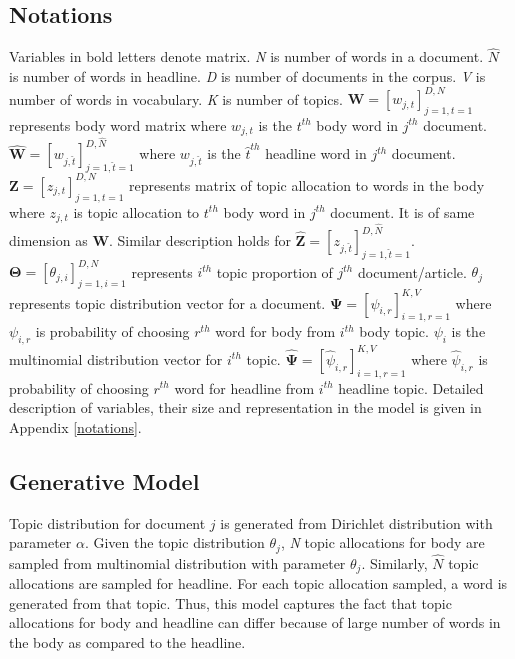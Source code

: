 \documentclass[a4paper]{article}
\begin{document}
\subsection{Notations}
Variables in bold letters denote matrix.
\emph{N} is number of words in a document. $\hat{N}$ is number of words in headline. \emph{D} is number of documents in the corpus. \emph{V} is number of words in vocabulary. \emph{K} is number of topics. $\mathbf{W} = [w_{j,t}]_{j=1, t=1}^{D, N}$ represents body word matrix where $w_{j,t}$ is the $t^{th}$ body word in $j^{th}$ document. $\mathbf{\hat{W}} = [w_{j,\hat{t}}]_{j=1,\hat{t}=1}^{D,\hat{N}}$ where $w_{j,\hat{t}}$ is the $\hat{t}^{th}$ headline word in $j^{th}$ document. $\mathbf{Z} = [z_{j,t}]_{j=1, t=1}^{D, N}$ represents matrix of topic allocation to words in the body where $z_{j,t}$ is topic allocation to $t^{th}$ body word in $j^{th}$ document. It is of same dimension as $\mathbf{W}$. Similar description holds for  $\mathbf{\hat{Z}} = [z_{j,\hat{t}}]_{j=1, \hat{t}=1}^{D, \hat{N}}$. $\mathbf{\Theta} = [\theta_{j,i}]_{j=1,i=1}^{D,N}$ represents $i^{th}$ topic proportion of $j^{th}$ document/article. $\theta_{j}$ represents topic distribution vector for a document. $\mathbf{\Psi} =  [\psi_{i,r}]_{i=1, r=1}^{K,V}$ where $\psi_{i,r}$ is probability of choosing $r^{th}$ word for body from $i^{th}$ body topic. $\psi_{i}$ is the multinomial distribution vector for $i^{th}$ topic. $\mathbf{\hat{\Psi}} =  [\hat{\psi}_{i,r}]_{i=1, r=1}^{K,V}$ where $\hat{\psi}_{i,r}$ is probability of choosing $r^{th}$ word for headline from $i^{th}$ headline topic. 
Detailed description of variables, their size and representation in the model is given in Appendix \ref{notations}.

\subsection{Generative Model}
Topic distribution for document $\textit{j}$ is generated from Dirichlet distribution with parameter \textit{$\alpha$}. Given the topic distribution \textit{$\theta_{j}$}, \textit{N} topic allocations for body are sampled from multinomial distribution with parameter \textit{$\theta_{j}$}. Similarly, \textit{$\hat{N}$} topic allocations are sampled for headline. For each topic allocation sampled, a word is generated from that topic. Thus, this model captures the fact that topic allocations for body and headline can differ because of large number of words in the body as compared to the headline. 
\end{document}
